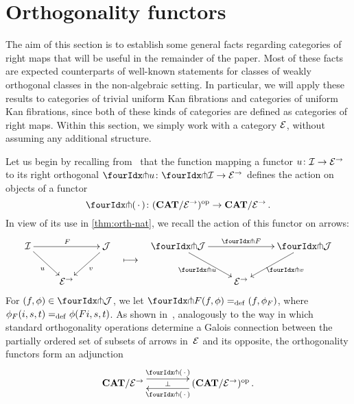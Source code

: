 \documentclass[reqno,10pt,a4paper,oneside,draft]{amsart}
\begin{document}
\section{Orthogonality functors}
\label{sec:ortf}

The aim of this section is to establish some general facts regarding categories of right maps that will be useful in the remainder of the paper. Most of these facts are expected counterparts of well-known statements for classes of weakly orthogonal classes in the non-algebraic setting. 
In particular, we will apply these results to categories of trivial uniform Kan fibrations and categories of uniform Kan fibrations, since both of these kinds of categories are defined as categories of right maps.
Within this section, we simply work with a category $\mathcal{E}$, without assuming any additional structure.

\medskip

Let us begin by recalling from~\cite{garner:small-object-argument} that the function mapping a functor $u \colon \mathcal{I} \to \mathcal{E}^\to$ to its right orthogonal $\liftr{u} \co \liftr{\cal{I}} \to \catE^\to$ defines the action on objects of a functor
\[
  \liftr{\brarghole} \co (\CAT/\catE^\to)^{\op} \to \CAT/\catE^\to \, .
\]
In view of its use in \cref{thm:orth-nat}, we recall the action of this functor on arrows:
\begin{align*}
\xymatrix{
  \cal{I} \ar[dr]_u \ar[rr]^F & & \cal{J} \ar[dl]^{v} \\
  & \catE^\to
}
&&
\xymatrix{
  \ar@{}[d]|{\textstyle\longmapsto} \\
  {}
}
&&
\xymatrix{
  \liftr{\cal{J}} \ar[dr]_{\liftr{u}} \ar[rr]^{\liftr{F}} & & \liftr{\cal{J}} \ar[dl]^{\liftr{v}} \\
  & \catE^\to
}
\end{align*}
For $(f, \phi) \in \liftr{\cal{J}}$, we let $\liftr{F}(f,\phi) \defeq (f, \phi_F)$, where $\phi_F(i, s, t) =_{\operatorname{def}} \phi(Fi, s, t)$.
As shown in~\cite[Proposition~3.8]{garner:small-object-argument}, analogously to the way in which standard orthogonality operations determine a Galois connection between the partially ordered set of subsets of arrows in~$\mathcal{E}$ and its opposite, the orthogonality functors form an adjunction
\begin{equation} \label{garner-adjunction}
\begin{gathered}
\xymatrix@C+2em{
  \CAT/\catE^\to
  \ar@<5pt>[r]^-{\liftl{\brarghole}}
  \ar@{}[r]|-{\bot}
&
  (\CAT/\catE^\to)^{\op} \, .
  \ar@<5pt>[l]^-{\liftr{\brarghole}}
}
\end{gathered}
\end{equation}
\end{document}

